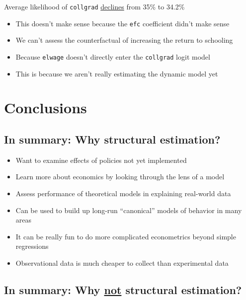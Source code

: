 \documentclass[11pt]{article}
\begin{document}
Average likelihood of \texttt{collgrad} \uline{declines} from 35\% to 34.2\%

\begin{itemize}
\item This doesn't make sense because the \texttt{efc} coefficient didn't make sense
\item We can't assess the counterfactual of increasing the return to schooling
\item Because \texttt{elwage} doesn't directly enter the \texttt{collgrad} logit model
\item This is because we aren't really estimating the dynamic model yet
\end{itemize}



\section{Conclusions}
\label{sec:orgb28b7fe}

\subsection{In summary: Why structural estimation?}
\label{sec:org9000536}

\begin{itemize}
\item Want to examine effects of policies not yet implemented
\item Learn more about economics by looking through the lens of a model
\item Assess performance of theoretical models in explaining real-world data
\item Can be used to build up long-run ``canonical'' models of behavior in many areas
\item It can be really fun to do more complicated econometrics beyond simple regressions
\item Observational data is much cheaper to collect than experimental data
\end{itemize}


\subsection{In summary: Why \underline{not} structural estimation?}
\label{sec:org2fec7b4}
\end{document}
